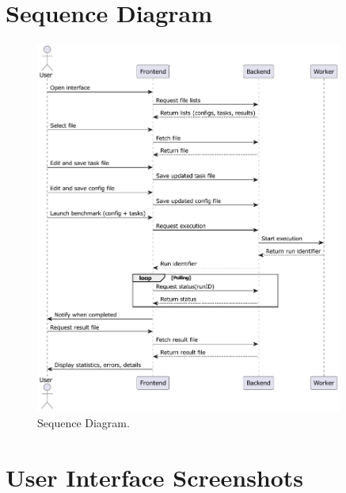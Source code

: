 \section{Sequence Diagram}
\label{appendix:sequence_diagram}


\begin{figure}[H]
    \includegraphics[width=0.9\textwidth]{./plantuml/sequence.pdf}
    \caption{Sequence Diagram.}
    \label{appendix:sequence}
\end{figure}

\section{User Interface Screenshots}
\label{appendix:ui_screenshots}

